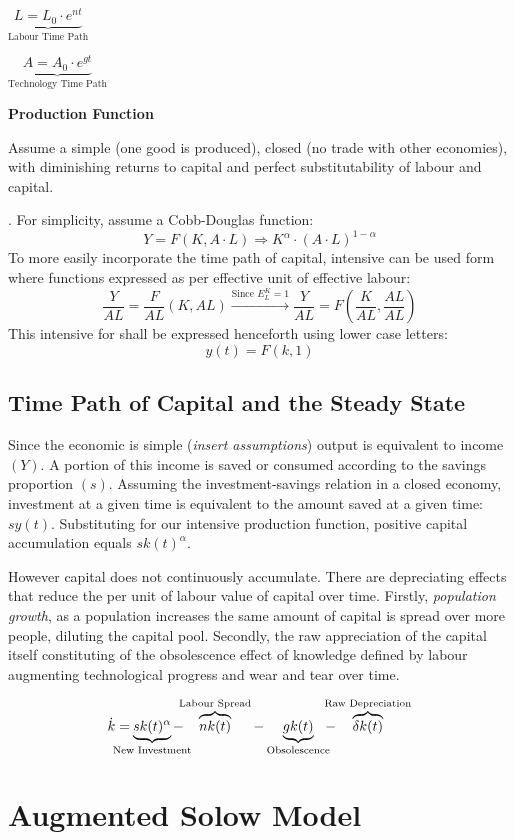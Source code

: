 \documentclass[11pt,a4paper]{article}
\renewcommand{\sectionmark}[1]{\markright{#1}}
\begin{document}
\begin{center}
\begin{multicols}{2}
$\underbrace{L = L_{0}\cdot e^{nt}}_{\text{Labour Time Path}}$   

\columnbreak

$\underbrace{A=A_{0}\cdot e^{gt}}_{\text{Technology Time Path}}$ 
\end{multicols}
\end{center}

\textbf{Production Function}

Assume a simple (one good is produced), closed (no trade with other economies), with diminishing returns to capital and perfect substitutability of labour and capital. 

. For simplicity, assume a Cobb-Douglas function:
$$
Y=F\left(K,A\cdot L\right) \Longrightarrow K^{\alpha}\cdot (A\cdot L)^{1-\alpha}
$$
To more easily incorporate the time path of capital, intensive can be used form where functions expressed as per effective unit of effective labour:
\[
\frac{Y}{AL} = \frac{F}{AL} \left(K, AL\right)\xrightarrow{\text{Since }E^K_L=1}
\frac{Y}{AL} = F\left( \frac{K}{AL}, \frac{AL}{AL}\right)
\]
This intensive for shall be expressed henceforth using lower case letters: \vspace{-1em}
$$
y(t) =F(k,1)
$$

\subsection*{Time Path of Capital and the Steady State}

Since the economic is simple (\textit{insert assumptions}) output is equivalent to income $(Y)$. A portion of this income is saved or consumed according to the savings proportion $(s)$. Assuming the investment-savings relation in a closed economy, investment at a given time is equivalent to the amount saved at a given time: $sy(t)$. Substituting for our intensive production function, positive capital accumulation equals $sk(t)^\alpha$.

However capital does not continuously accumulate. There are depreciating effects that reduce the per unit of labour value of capital over time. Firstly, \textit{population growth}, as a population increases the same amount of capital is spread over more people, diluting the capital pool. Secondly, the raw appreciation of the capital itself constituting of the obsolescence effect of knowledge defined by labour augmenting technological progress and wear and tear over time. 


\[\dot{k}=\kern-15pt\underbrace{sk(t)^{\alpha}}_{\text{New Investment}}\kern-15pt - \kern-5pt\overbrace{nk(t)}^{\text{Labour Spread}} - \underbrace{gk(t)}_{\text{Obsolescence}} \kern-5pt - \kern-10pt \overbrace{\delta k(t)}^{\text{Raw Depreciation}}
\]

\section*{Augmented Solow Model}
\sectionmark{The Augmented Model}


\newpage

\printbibliography[title=Bibliography]
\end{document}
